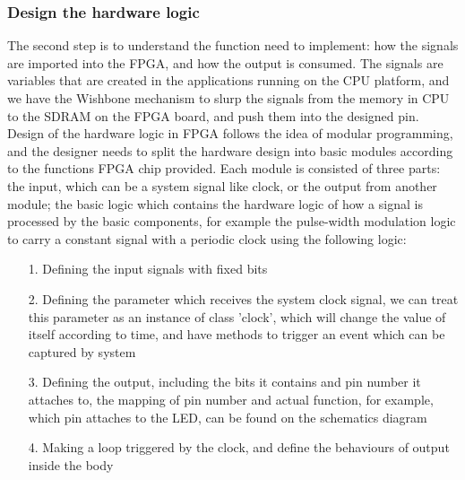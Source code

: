 \documentclass[11pt,openright,a4paper]{report}
\begin{document}
\subsubsection{Design the hardware logic}
The second step is to understand the function need to implement: how the signals are imported into the FPGA, and how the output is consumed. The signals are variables that are created in the applications running on the CPU platform, and we have the Wishbone mechanism to slurp the signals from the memory in CPU to the SDRAM on the FPGA board, and push them into the designed pin. \\
Design of the hardware logic in FPGA follows the idea of modular programming, and the designer needs to split the hardware design into basic modules according to the functions FPGA chip provided. Each module is consisted of three parts: the input, which can be a system signal like clock, or the output from another module; the basic logic which contains the hardware logic of how a signal is processed by the basic components, for example the pulse-width modulation logic to carry a constant signal with a periodic clock using the following logic:
\begin{itemize}
	\item[1.] Defining the input signals with fixed bits
	\item[2.] Defining the parameter which receives the system clock signal, we can treat this parameter as an instance of class 'clock', which will change the value of itself according to time, and have methods to trigger an event which can be captured by system
	\item[3.] Defining the output, including the bits it contains and pin number it attaches to, the mapping of pin number and actual function, for example, which pin attaches to the LED, can be found on the schematics diagram
	\item[4.] Making a loop triggered by the clock, and define the behaviours of output inside the body
\end{itemize}	
\end{document}
